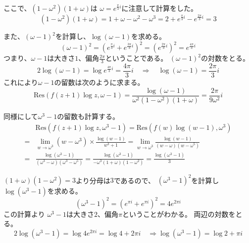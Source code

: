 \documentclass[12pt,b5paper]{ltjsarticle}
\begin{document}
ここで、$(1-\omega^2)(1+\omega)$は
$\omega= e^{\frac{\pi}{3}i}$に注意して計算をした。
\begin{equation}
 (1-\omega^2)(1+\omega)
  =1+\omega -\omega^2-\omega^3
  =2+e^{\frac{\pi}{3}i} -e^{\frac{2\pi}{3}i}
  =3
\end{equation}

また、$(\omega-1)^2$を計算し、$\log{(\omega-1)}$を求める。
\begin{equation}
 (\omega-1)^2
  = ( e^{\frac{\pi}{3}i} + e^{\frac{3\pi}{3}i})^2
  = ( e^{\frac{2\pi}{3}i} )^2
  = e^{\frac{4\pi}{3}i}
\end{equation}
つまり、$\omega-1$は大きさ$1$、偏角$\frac{2\pi}{3}$ということである。
$(\omega-1)^2$の対数をとる。
\begin{equation}
 2\log{(\omega-1)}
  = \log{ e^{\frac{4\pi}{3}i} }
  = \frac{4\pi}{3}i
  \quad \Rightarrow \quad
  \log{(\omega-1)} = \frac{2\pi}{3}i
\end{equation}
これにより$\omega-1$の留数は次のように求まる。
\begin{equation}
 \mathrm{Res}(f(z+1)\log{z},\omega-1)
  = \frac{\log{(\omega-1)}}{\omega^2(1-\omega^2)(1+\omega)}
  = \frac{ 2\pi}{9\omega^2}i
\end{equation}

同様にして$\omega^3-1$の留数も計算する。
\begin{align}
 & \mathrm{Res}(f(z+1)\log{z},\omega^3-1)
 =
 \mathrm{Res}(f(w)\log{(w-1)},\omega^3)\\
 =&
 \lim_{w\to \omega^3}(w-\omega^3)\times \frac{\log{(w-1)}}{w^3+1}
  =
 \lim_{w\to \omega^3} \frac{\log{(w-1)}}{(w-\omega)(w-\omega^5)}\\
 =&
 \frac{\log{(\omega^3-1)}}{(\omega^3-\omega)(\omega^3-\omega^5)}
 =
 \frac{\log{(\omega^3-1)}}{-\omega^3(1+\omega)(1-\omega^2)}
 =
 \frac{\log{(\omega^3-1)}}{3}
\end{align}

$(1+\omega)(1-\omega^2)=3$より分母は$3$であるので、
$(\omega^3-1)^2$を計算し$\log{(\omega^3-1)}$を求める。
\begin{equation}
 (\omega^3-1)^2
  = (e^{\pi i} + e^{\pi i})^2
  = 4e^{2\pi i}
\end{equation}
この計算より
$\omega^3-1$は大きさ$2$、偏角$\pi$ということがわかる。
両辺の対数をとる。
\begin{equation}
 2\log{(\omega^3-1)}
  = \log{4e^{2\pi i}}
  = \log{4} + 2\pi i
  \quad \Rightarrow
  \log{(\omega^3-1)}
  = \log{2} + \pi i
\end{equation}
\end{document}
